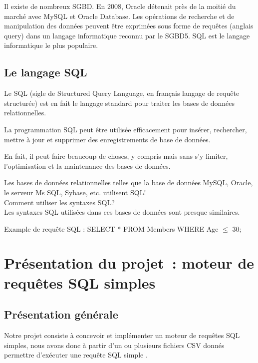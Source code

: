 \documentclass[oneside,13pt,a4paper]{report}
\begin{document}
            Il existe de nombreux SGBD. En 2008, Oracle détenait près de la moitié du marché avec MySQL et Oracle Database.
            Les opérations de recherche et de manipulation des données peuvent être exprimées sous forme de requêtes (anglais query) 
            dans un langage informatique reconnu par le SGBD5. SQL est le langage informatique le plus populaire.


        \section{Le langage SQL}

            Le SQL (sigle de Structured Query Language, en français langage de requête structurée) est en fait le langage standard pour traiter les bases de données relationnelles.

            La programmation SQL peut être utilisée efficacement pour insérer, rechercher, mettre à jour et supprimer des enregistrements de base de données.

            En fait, il peut faire beaucoup de choses, y compris mais sans s'y limiter, l'optimisation et la maintenance des bases de données.

            Les bases de données relationnelles telles que la base de données MySQL, Oracle, le serveur Ms SQL, Sybase, etc. utilisent SQL!\\
            Comment utiliser les syntaxes SQL? \\
            Les syntaxes SQL utilisées dans ces bases de données sont presque similaires.

            Example de requête SQL : SELECT * FROM Members WHERE Age $ \leq $ 30;

    \chapter{Présentation du projet : moteur de requêtes SQL simples}

    \section{Présentation générale}

        Notre projet consiste à concevoir et implémenter un moteur de requêtes SQL simples, 
        nous avons donc à partir d’un ou plusieurs fichiers CSV donnés permettre d’exécuter une requête SQL simple .
\end{document}
